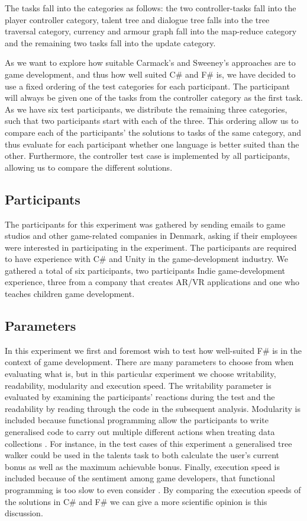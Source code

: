 The tasks fall into the categories as follows: the two controller-tasks fall into the player controller category, talent tree and dialogue tree falls into the tree traversal category, currency and armour graph fall into the map-reduce category and the remaining two tasks fall into the  update category.

As we want to explore how suitable Carmack's and Sweeney's approaches are to game development, and thus how well suited C\# and F\# is, we have decided to use a fixed ordering of the test categories for each participant. The participant will always be given one of the tasks from the controller category as the first task. As we have six test participants, we distribute the remaining three categories, such that two participants start with each of the three. This ordering allow us to compare each of the participants' the solutions to tasks of the same category, and thus evaluate for each participant whether one language is better suited than the other. Furthermore, the controller test case is implemented by all participants, allowing us to compare the different solutions.

\subsection{Participants}
The participants for this experiment was gathered by sending emails to game studios and other game-related companies in Denmark, asking if their employees were interested in participating in the experiment. The participants are required to have experience with C\# and Unity in the game-development industry. We gathered a total of six participants, two participants Indie game-development experience, three from a company that creates \gls{AR}/\gls{VR} applications and one who teaches children game development.

\subsection{Parameters}
In this experiment we first and foremost wish to test how well-suited F\# is in the context of game development. There are many parameters to choose from when evaluating what \textit{} is, but in this particular experiment we choose writability, readability, modularity and execution speed. The writability parameter is evaluated by examining the participants' reactions during the test and the readability by reading through the code in the subsequent analysis. Modularity is included because functional programming allow the participants to write generalised code to carry out multiple different actions when treating data collections \cite{hughes1989functional}. For instance, in the test cases of this experiment a generalised tree walker could be used in the talents task to both calculate the user's current bonus as well as the maximum achievable bonus. Finally, execution speed is included because of the sentiment among game developers, that functional programming is too slow to even consider \cite{pop:functional:slow, pop:functional:sucks}. By comparing the execution speeds of the solutions in C\# and F\# we can give a more scientific opinion is this discussion.

